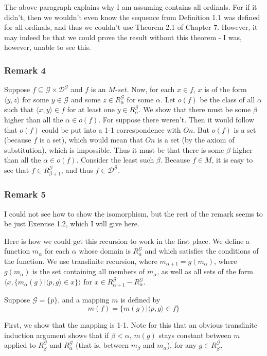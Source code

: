 \documentclass{article}
\theoremstyle{definition}
\begin{document}
The above paragraph explains why I am assuming contains all ordinals. For if it didn't, then 
we wouldn't even know the sequence from Definition 1.1 was defined for all ordinals, and thus we couldn't use 
Theorem 2.1 of Chapter 7. However, it may indeed be that we could prove the result without this theorem - I was, however, 
unable to see this.

\subsubsection*{Remark 4}
Suppose $f\subseteq\mathcal{G}\times\mathcal{D}^\mathcal{G}$ and $f$ is an $M$-$set$. Now, for 
each $x\in f$, $x$ is of the form $\langle y,z\rangle$ for some $y\in\mathcal{G}$ and some 
$z\in R^\mathcal{G}_\alpha$ for some $\alpha$. Let $o(f)$ be the class of all 
$\alpha$ such that $\langle x,y\rangle\in f$ for at least one $y\in R^\mathcal{G}_\alpha$. We show that there must be some 
$\beta$ higher than all the $\alpha\in o(f)$. For suppose there weren't. Then it would follow that 
$o(f)$ could be put into a 1-1 correspondence with $On$. But $o(f)$ is a set (because $f$ is a set), which would 
mean that $On$ is a set (by the axiom of substitution), which is impossible. Thus it must be that there is some 
$\beta$ higher than all the $\alpha\in o(f)$. Consider the least such $\beta$. Because $f\in M$, it is easy to see that 
$f\in R^\mathcal{G}_{\beta+1}$, and thus $f\in\mathcal{D}^\mathcal{G}$.

\subsubsection*{Remark 5}
I could not see how to show the isomorphism, but the rest of the remark seems to be just Exercise 1.2, which I will give here.

Here is how we could get this recursion to work in the first place. We define a function $m_\alpha$ for each 
$\alpha$ whose domain is $R^\mathcal{G}_\alpha$ and which satisfies the conditions of the function. We use 
transfinite recursion, where $m_{\alpha+1}=g(m_\alpha)$, where 
$g(m_\alpha)$ is the set containing all members of $m_\alpha$, as well as all 
sets of the form $\langle x,\{m_\alpha(g)|\langle p,g\rangle\in x\}\rangle$ for $x\in R^\mathcal{G}_{\alpha+1}-R^\mathcal{G}_\alpha$. 

Suppose $\mathcal{G}=\{p\}$, and a mapping $m$ is defined by
\[ m(f)=\{m(g)|\langle p,g\rangle\in f\} \]

First, we show that the mapping is 1-1. Note for this that an obvious transfinite induction argument shows that
if $\beta<\alpha$, $m(g)$ stays constant between $m$ applied to $R^\mathcal{G}_\beta$ and $R^\mathcal{G}_\alpha$
(that is, between $m_\beta$ and $m_\alpha$), for any $g\in R^\mathcal{G}_\beta$.
\end{document}
